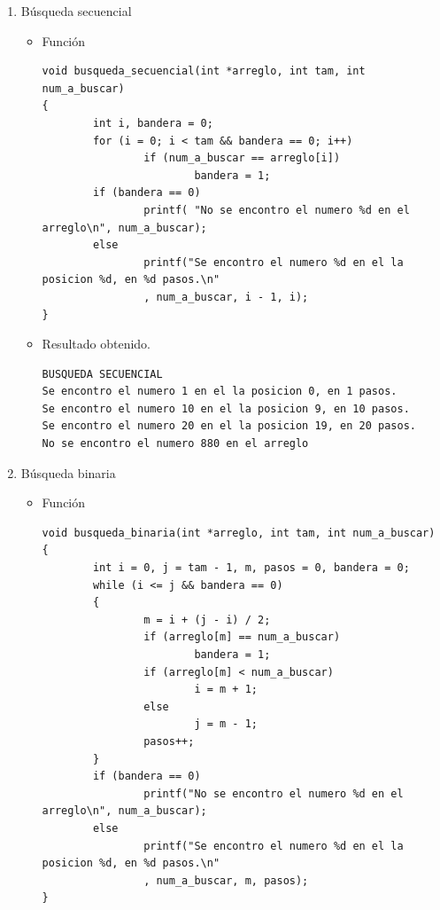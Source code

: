 \documentclass[a4paper,12pt]{article}
\begin{document}
\begin{enumerate}
\item Búsqueda secuencial
\begin{itemize}
\item Función
\\ \lstset{basicstyle=\tiny,style=myCustomMatlabStyle}
\begin{lstlisting}
void busqueda_secuencial(int *arreglo, int tam, int num_a_buscar)
{
        int i, bandera = 0;
        for (i = 0; i < tam && bandera == 0; i++)
                if (num_a_buscar == arreglo[i])
                        bandera = 1;
        if (bandera == 0)
                printf( "No se encontro el numero %d en el arreglo\n", num_a_buscar);
        else
                printf("Se encontro el numero %d en el la posicion %d, en %d pasos.\n"
                , num_a_buscar, i - 1, i);
}
\end{lstlisting}
\item Resultado obtenido.
\\ \lstset{basicstyle=\tiny}
\begin{lstlisting}
BUSQUEDA SECUENCIAL
Se encontro el numero 1 en el la posicion 0, en 1 pasos.
Se encontro el numero 10 en el la posicion 9, en 10 pasos.
Se encontro el numero 20 en el la posicion 19, en 20 pasos.
No se encontro el numero 880 en el arreglo
\end{lstlisting}
\end{itemize}
\item Búsqueda binaria
\begin{itemize}
\item Función

\lstset{basicstyle=\tiny}
\begin{lstlisting}
void busqueda_binaria(int *arreglo, int tam, int num_a_buscar)
{
        int i = 0, j = tam - 1, m, pasos = 0, bandera = 0;
        while (i <= j && bandera == 0)
        {
                m = i + (j - i) / 2;
                if (arreglo[m] == num_a_buscar)
                        bandera = 1;
                if (arreglo[m] < num_a_buscar)
                        i = m + 1;
                else
                        j = m - 1;
                pasos++;
        }
        if (bandera == 0)
                printf("No se encontro el numero %d en el arreglo\n", num_a_buscar);
        else
                printf("Se encontro el numero %d en el la posicion %d, en %d pasos.\n"
                , num_a_buscar, m, pasos);
}

\end{lstlisting}


\end{itemize}
\end{enumerate}
\end{document}
